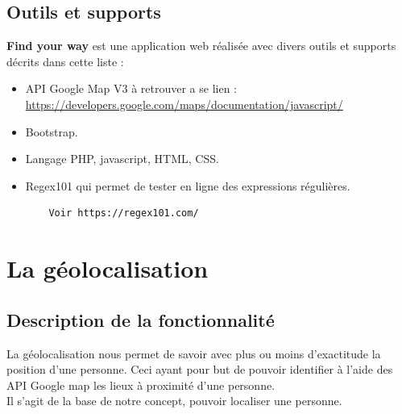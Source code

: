 \documentclass[10pt,a4paper]{report}
\begin{document}
\subsection{Outils et supports}

\begin{flushleft}
\textbf{Find your way} est une application web réalisée avec divers outils et supports décrits dans cette liste :

\begin{itemize}

\item API Google Map V3 à retrouver a se lien :
\url{https://developers.google.com/maps/documentation/javascript/}

\item Bootstrap.

\item Langage PHP, javascript, HTML, CSS. 

\item Regex101 qui permet de tester en ligne des expressions régulières.
\begin{verbatim}
	Voir https://regex101.com/ 
\end{verbatim}

\end{itemize}
\end{flushleft}


\section{La géolocalisation}

\subsection{Description de la fonctionnalité}
\begin{flushleft}
La géolocalisation nous permet de savoir avec plus ou moins d'exactitude la position d'une personne. Ceci ayant pour but de pouvoir identifier à l'aide des API Google map les lieux à proximité d'une personne. \\

Il s'agit de la base de notre concept, pouvoir localiser une personne.
\end{flushleft}
\end{document}
